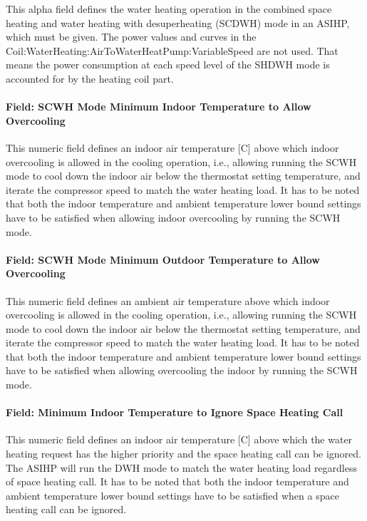 This alpha field defines the water heating operation in the combined space heating and water heating with desuperheating (SCDWH) mode in an ASIHP, which must be given. The power values and curves in the Coil:WaterHeating:AirToWaterHeatPump:VariableSpeed are not used. That means the power consumption at each speed level of the SHDWH mode is accounted for by the heating coil part.

\paragraph{Field: SCWH Mode Minimum Indoor Temperature to Allow Overcooling}\label{Field-SCWH-Minimum-In-Overcooling-ASIHP}

This numeric field defines an indoor air temperature [C] above which indoor overcooling is allowed in the cooling operation, i.e., allowing running the SCWH mode to cool down the indoor air below the thermostat setting temperature, and iterate the compressor speed to match the water heating load. It has to be noted that both the indoor temperature and ambient temperature lower bound settings have to be satisfied when allowing indoor overcooling by running the SCWH mode.


\paragraph{Field: SCWH Mode Minimum Outdoor Temperature to Allow Overcooling}\label{Field-SCWH-Minimum-Outdoor-ASIHP}

This numeric field defines an ambient air temperature above which indoor overcooling is allowed in the cooling operation, i.e., allowing running the SCWH mode to cool down the indoor air below the thermostat setting temperature, and iterate the compressor speed to match the water heating load. It has to be noted that both the indoor temperature and ambient temperature lower bound settings have to be satisfied when allowing overcooling the indoor by running the SCWH mode.

\paragraph{Field: Minimum Indoor Temperature to Ignore Space Heating Call}\label{Field-Minimum-Indoor-IgnoreSH-ASIHP}

This numeric field defines an indoor air temperature [C] above which the water heating request has the higher priority and the space heating call can be ignored. The ASIHP will run the DWH mode to match the water heating load regardless of space heating call. It has to be noted that both the indoor temperature and ambient temperature lower bound settings have to be satisfied when a space heating call can be ignored.


